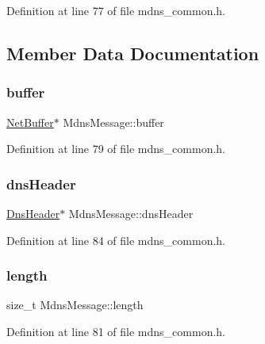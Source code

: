 Definition at line 77 of file mdns\+\_\+common.\+h.



\subsection{Member Data Documentation}
\mbox{\label{structMdnsMessage_ad8fde78bc679ed4dd16b6bc6ad39b94d}} 
\subsubsection{\texorpdfstring{buffer}{buffer}}
{\footnotesize\ttfamily \hyperlink{structNetBuffer}{Net\+Buffer}$\ast$ Mdns\+Message\+::buffer}



Definition at line 79 of file mdns\+\_\+common.\+h.

\mbox{\label{structMdnsMessage_ac5ab08c143472d040db637c76c972cab}} 
\subsubsection{\texorpdfstring{dns\+Header}{dnsHeader}}
{\footnotesize\ttfamily \hyperlink{dns__common_8h_a5caa7816ce531b3920054e974a0679f3}{Dns\+Header}$\ast$ Mdns\+Message\+::dns\+Header}



Definition at line 84 of file mdns\+\_\+common.\+h.

\mbox{\label{structMdnsMessage_ad1ebbfad05745924fdeee3389f270e52}} 
\subsubsection{\texorpdfstring{length}{length}}
{\footnotesize\ttfamily size\+\_\+t Mdns\+Message\+::length}



Definition at line 81 of file mdns\+\_\+common.\+h.

\mbox{\label{structMdnsMessage_a2d5521f923d6c184a8923827f3cdcc1e}} 
